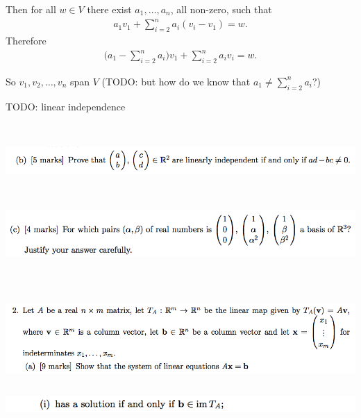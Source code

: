 \documentclass[12pt]{article}
\begin{document}
Then for all $w \in V$ there exist $a_1, \ldots, a_n$, all non-zero, such that
\begin{align*}
  a_1v_1 + \sum_{i=2}^n a_i(v_i - v_1) = w.
\end{align*}
Therefore
\begin{align*}
  \Big(a_1 - \sum_{i=2}^na_i\Big)v_1 + \sum_{i=2}^n a_iv_i = w.
\end{align*}

So $v_1, v_2, \ldots, v_n$ span $V$ (TODO: but how do we know that $a_1 \neq \sum_{i=2}^na_i$?)

TODO: linear independence

~\\
\begin{mdframed}
\includegraphics[width=400pt]{img/oxford-prelims-2017-A-1-2.png}
\end{mdframed}

~\\
\begin{mdframed}
\includegraphics[width=400pt]{img/oxford-prelims-2017-A-1-3.png}
\end{mdframed}

~\\
\subsection*{}  %
\begin{mdframed}
\includegraphics[width=400pt]{img/oxford-prelims-2017-A-2-1.png}
\end{mdframed}

\subsection*{}  %
\begin{mdframed}
\includegraphics[width=400pt]{img/oxford-prelims-2017-A-2-1-1.png}
\end{mdframed}
\end{document}
